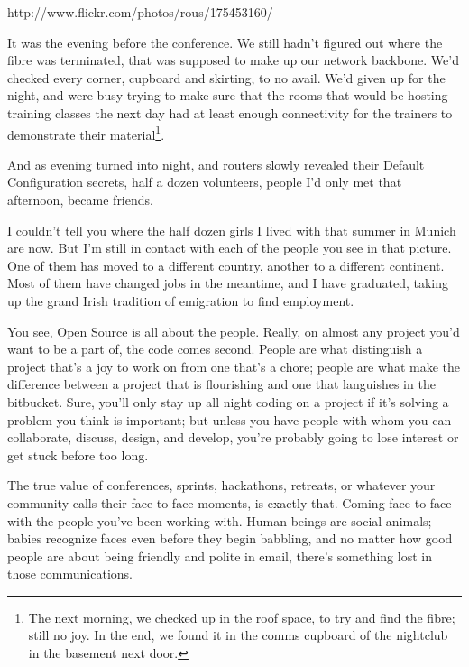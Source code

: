 http://www.flickr.com/photos/rous/175453160/

It was the evening before the conference. We still hadn't figured out
where the fibre was terminated, that was supposed to make up our
network backbone. We'd checked every corner, cupboard and skirting, to
no avail. We'd given up for the night, and were busy trying to make
sure that the rooms that would be hosting training classes the next
day had at least enough connectivity for the trainers to demonstrate
their material\footnote{The next morning, we checked up in the roof space, to try and find
the fibre; still no joy. In the end, we found it in the comms cupboard
of the nightclub in the basement next door.}.

And as evening turned into night, and routers slowly revealed their
Default Configuration secrets, half a dozen volunteers, people I'd
only met that afternoon, became friends.

I couldn't tell you where the half dozen girls I lived with that
summer in Munich are now. But I'm still in contact with each of the
people you see in that picture. One of them has moved to a different
country, another to a different continent. Most of them have changed
jobs in the meantime, and I have graduated, taking up the grand Irish
tradition of emigration to find employment.

You see, Open Source is all about the people. Really, on almost any
project you’d want to be a part of, the code comes second. People are
what distinguish a project that’s a joy to work on from one that’s a
chore; people are what make the difference between a project that is
flourishing and one that languishes in the bitbucket. Sure, you’ll
only stay up all night coding on a project if it’s solving a problem
you think is important; but unless you have people with whom you can
collaborate, discuss, design, and develop, you’re probably going to
lose interest or get stuck before too long.

The true value of conferences, sprints, hackathons, retreats, or
whatever your community calls their face-to-face moments, is exactly
that. Coming face-to-face with the people you’ve been working with.
Human beings are social animals; babies recognize faces even before
they begin babbling, and no matter how good people are about being
friendly and polite in email, there’s something lost in those
communications.


